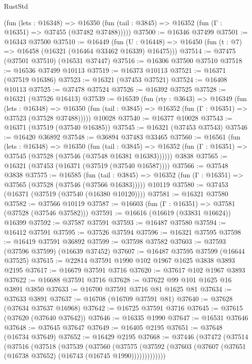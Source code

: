 \begin{lexlean}{RustStd}
\begin{coremodule}
      (fun (lets : @16348) =>
      @16350 (fun (tail : @3845) => @16352 (fun (Γ : @16351) => @37455 (@37482 @37488)))))
@37500 := @16346 @37499
@37501 := @16343 @37500
@37510 := @16449
    (fun (U : @16448) => @16450 (fun (t : @7) => @16458 (@16321 (@16464 @33462 @16339) @16475)))
@37514 := @37475 (@37501 @37510) (@16531 @37447)
@37516 := @16306 @37500 @37510
@37518 := @16536 @37499 @10113
@37519 := @16373 @10113
@37521 := @16371 (@37519 @16386)
@37523 := @16321 (@37453 @37521)
@37524 := @16408 @10113
@37525 := @37478 @37524
@37526 := @16392 @37525
@37528 := @16321 (@37526 @16413)
@37539 := @16539
    (fun (rty : @3643) =>
    @16349
      (fun (lets : @16348) =>
      @16350 (fun (tail : @3845) => @16352 (fun (Γ : @16351) => @37523 (@37528 @37488)))))
    @10028
@37540 := @16377 @10028
@37543 := @16371 (@37519 (@37540 @16385))
@37545 := @16321 (@37453 @37543)
@37546 := @16420 @36892
@37548 := @36894 @37483 @33465
@37560 := @16561
    (fun (lets : @16348) =>
    @16350
      (fun (tail : @3845) =>
      @16352 (fun (Γ : @16351) => @37545 (@37528 (@37546 (@37548 @16381 @16383))))))
    @3838
@37565 := @16321 (@37453 (@16371 (@37519 (@37540 @16587))))
@37566 := @37548 @3838
@37575 := @16585
    (fun (tail : @3845) => @16352 (fun (Γ : @16351) => @37565 (@37528 (@37546 (@37566 @16383)))))
    @10119
@37580 := @37453 (@16371 (@37519 (@37540 (@16380 @10120))))
@37581 := @16321 @37580
@37582 := @37566 @10119
@37587 := @16603 (fun (Γ : @16351) => @37581 (@37528 (@37546 @37582)))
@37591 := @16616 (@16619 (@33831 @16624)) @16399
@37592 := @37587 @37591
@37593 := @16487 @37580
@37594 := @16412 @37591
@37595 := @37526 @37594
@37596 := @16321 @37595
@37598 := @16419 @37591 @36892
@37599 := @37598 @37582
@37603 := @37593 (@37596 @37599) (@16639 @37452)
@37607 := @16487 @37595 @37599 (@16644 @37525)
@37615 := @22814 @37591 @1990 @102 @1967 @1625 @3838 @3893 @2195
@37617 := @16679 @37591 @3716
@37620 := @37617 @102 @1967 @3893
@37622 := @16688 @37591 @3716
@37628 := @37622 @99 @101 @1625 @16 @3891 @3850
@37633 := @16700 @37591 @3716 @81 @1625 @81
@37634 := @37633 @3891
@37637 := @16708 (@16709 @37591 @81)
@37640 := @37628 (@37634 @37637 @16968)
@37642 := @16725 @37591 @3716
@37645 := @37615 (@37620 (@37640 @37642))
@37646 := @16335 @1990
@37647 := @16531 @37646
@37648 := @37645 @37647
@37649 := @16405 @2195
@37651 := @37648 (@16734 @37649)
@37652 := @16429 @2195
@37668 := @37446
    (@37472
      (@37514
        (@37516
          (@37518
            (@37539
              (@37560
                (@37575
                  (@37592 (@37603 (@37607 (@37651 (@16738 @37652) (@16743 (@16745 @1990)))))))))))))

\end{coremodule}
\end{lexlean}
